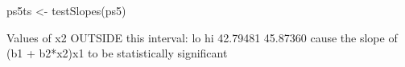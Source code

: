 \begin{Schunk}
\begin{Sinput}
 ps5ts <- testSlopes(ps5)
\end{Sinput}
\begin{Soutput}
Values of x2 OUTSIDE this interval:
      lo       hi 
42.79481 45.87360 
cause the slope of (b1 + b2*x2)x1 to be statistically significant
\end{Soutput}
\end{Schunk}
